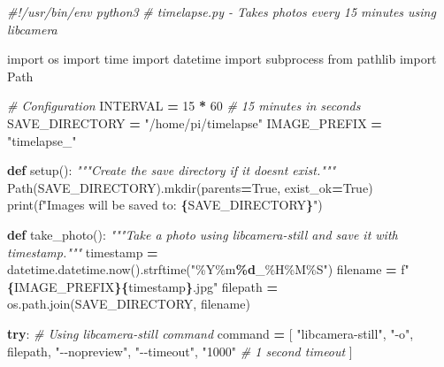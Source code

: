 \documentclass[
]{article}
\newenvironment{Shaded}{\begin{snugshade}}{\end{snugshade}}
\newcommand{\BuiltInTok}[1]{#1}
\newcommand{\CommentTok}[1]{\textcolor[rgb]{0.56,0.35,0.01}{\textit{#1}}}
\newcommand{\ControlFlowTok}[1]{\textcolor[rgb]{0.13,0.29,0.53}{\textbf{#1}}}
\newcommand{\DecValTok}[1]{\textcolor[rgb]{0.00,0.00,0.81}{#1}}
\newcommand{\ImportTok}[1]{#1}
\newcommand{\KeywordTok}[1]{\textcolor[rgb]{0.13,0.29,0.53}{\textbf{#1}}}
\newcommand{\NormalTok}[1]{#1}
\newcommand{\OperatorTok}[1]{\textcolor[rgb]{0.81,0.36,0.00}{\textbf{#1}}}
\newcommand{\SpecialCharTok}[1]{\textcolor[rgb]{0.81,0.36,0.00}{\textbf{#1}}}
\newcommand{\SpecialStringTok}[1]{\textcolor[rgb]{0.31,0.60,0.02}{#1}}
\newcommand{\StringTok}[1]{\textcolor[rgb]{0.31,0.60,0.02}{#1}}
\newcommand{\VariableTok}[1]{\textcolor[rgb]{0.00,0.00,0.00}{#1}}
\begin{document}
\begin{Shaded}
\begin{Highlighting}[]
\CommentTok{\#!/usr/bin/env python3}
\CommentTok{\# timelapse.py {-} Takes photos every 15 minutes using libcamera}

\ImportTok{import}\NormalTok{ os}
\ImportTok{import}\NormalTok{ time}
\ImportTok{import}\NormalTok{ datetime}
\ImportTok{import}\NormalTok{ subprocess}
\ImportTok{from}\NormalTok{ pathlib }\ImportTok{import}\NormalTok{ Path}

\CommentTok{\# Configuration}
\NormalTok{INTERVAL }\OperatorTok{=} \DecValTok{15} \OperatorTok{*} \DecValTok{60}  \CommentTok{\# 15 minutes in seconds}
\NormalTok{SAVE\_DIRECTORY }\OperatorTok{=} \StringTok{"/home/pi/timelapse"}
\NormalTok{IMAGE\_PREFIX }\OperatorTok{=} \StringTok{"timelapse\_"}

\KeywordTok{def}\NormalTok{ setup():}
    \CommentTok{"""Create the save directory if it doesn\textquotesingle{}t exist."""}
\NormalTok{    Path(SAVE\_DIRECTORY).mkdir(parents}\OperatorTok{=}\VariableTok{True}\NormalTok{, exist\_ok}\OperatorTok{=}\VariableTok{True}\NormalTok{)}
    \BuiltInTok{print}\NormalTok{(}\SpecialStringTok{f"Images will be saved to: }\SpecialCharTok{\{}\NormalTok{SAVE\_DIRECTORY}\SpecialCharTok{\}}\SpecialStringTok{"}\NormalTok{)}

\KeywordTok{def}\NormalTok{ take\_photo():}
    \CommentTok{"""Take a photo using libcamera{-}still and save it with timestamp."""}
\NormalTok{    timestamp }\OperatorTok{=}\NormalTok{ datetime.datetime.now().strftime(}\StringTok{"\%Y\%m}\SpecialCharTok{\%d}\StringTok{\_\%H\%M\%S"}\NormalTok{)}
\NormalTok{    filename }\OperatorTok{=} \SpecialStringTok{f"}\SpecialCharTok{\{}\NormalTok{IMAGE\_PREFIX}\SpecialCharTok{\}\{}\NormalTok{timestamp}\SpecialCharTok{\}}\SpecialStringTok{.jpg"}
\NormalTok{    filepath }\OperatorTok{=}\NormalTok{ os.path.join(SAVE\_DIRECTORY, filename)}
    
    \ControlFlowTok{try}\NormalTok{:}
        \CommentTok{\# Using libcamera{-}still command}
\NormalTok{        command }\OperatorTok{=}\NormalTok{ [}
            \StringTok{"libcamera{-}still"}\NormalTok{,}
            \StringTok{"{-}o"}\NormalTok{, filepath,}
            \StringTok{"{-}{-}nopreview"}\NormalTok{,}
            \StringTok{"{-}{-}timeout"}\NormalTok{, }\StringTok{"1000"}  \CommentTok{\# 1 second timeout}
\NormalTok{        ]}
        

\end{Highlighting}
\end{Shaded}
\end{document}
